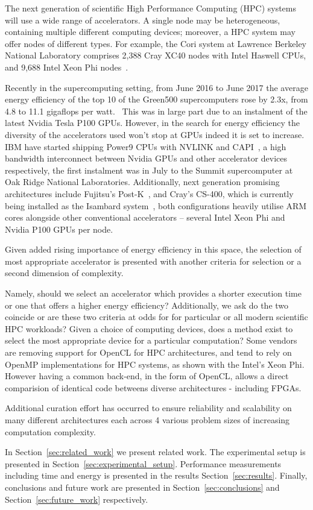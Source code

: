 \documentclass[../document.tex]{subfiles}
\begin{document}
\label{sec:introduction}

The next generation of scientific High Performance Computing (HPC) systems will use a wide range of accelerators.
A single node may be heterogeneous, containing multiple different computing devices; moreover, a HPC system may offer nodes of different types.
For example, the Cori system at Lawrence Berkeley National Laboratory comprises 2,388 Cray XC40 nodes with Intel Haswell CPUs, and 9,688 Intel Xeon Phi nodes~\cite{declerck2016cori}.


Recently in the supercomputing setting, from June 2016 to June 2017 the average energy efficiency of the top 10 of the Green500 supercomputers rose by 2.3x, from 4.8 to 11.1 gigaflops per watt.~\cite{feldman_2017}
This was in large part due to an instalment of the latest Nvidia Tesla P100 GPUs.
However, in the search for energy efficiency the diversity of the accelerators used won't stop at GPUs indeed it is set to increase.
IBM have started shipping Power9 CPUs with NVLINK and CAPI~\cite{morgan_2016}, a high bandwidth interconnect between Nvidia GPUs and other accelerator devices respectively, the first instalment was in July to the Summit supercomputer at Oak Ridge National Laboratories.\cite{morgan_2017}
Additionally, next generation promising architectures include Fujitsu's Post-K~\cite{morgan_2016_postk}, and Cray's CS-400, which is currently being installed as the Isambard system~\cite{feldman_2017_isambard}, both configurations heavily utilise ARM cores alongside other conventional accelerators -- several Intel Xeon Phi and Nvidia P100 GPUs per node.

Given added rising importance of energy efficiency in this space, the selection of most appropriate accelerator is presented with another criteria for selection or a second dimension of complexity.

Namely, should we select an accelerator which provides a shorter execution time or one that offers a higher energy efficiency?
Additionally, we ask do the two coincide or are these two criteria at odds for for particular or all modern scientific HPC workloads?
Given a choice of computing devices, does a method exist to select the most appropriate device for a particular computation?
Some vendors are removing support for OpenCL for HPC architectures, and tend to rely on OpenMP implementations for HPC systems, as shown with the Intel's Xeon Phi.
However having a common back-end, in the form of OpenCL, allows a direct comparision of identical code betweens diverse architectures - including FPGAs.

Additional curation effort has occurred to ensure reliability and scalability on many different architectures each across 4 various problem sizes of increasing computation complexity.

In Section~\ref{sec:related_work} we present related work.
The experimental setup is presented in Section~\ref{sec:experimental_setup}.
Performance measurements including time and energy is presented in the results Section~\ref{sec:results}.
Finally, conclusions and future work are presented in Section~\ref{sec:conclusions} and Section~\ref{sec:future_work} respectively.
\end{document}
